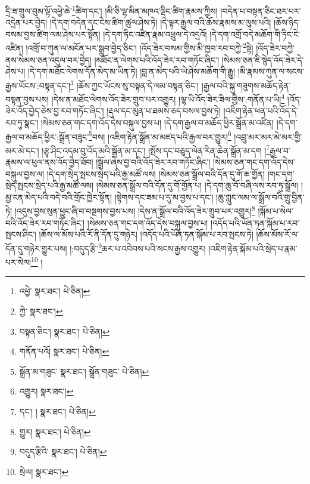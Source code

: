 དྲི་ཟ་གྲུལ་བུམ་ལྟོ་འཕྱེ་ཆེ་\footnote{འཕྱེ་  སྣར་ཐང་།  པེ་ཅིན། }ཚིག་དང་། །མི་ཅི་ལྷ་མིན་མཁའ་ལྡིང་ཚིག་རྣམས་ཀྱིས། །བདེན་པ་བསྟན་ཅིང་ཐར་པར་འདྲེན་པར་བྱེད། །དེ་དག་བདེན་དང་ངེས་ཚིག་ཚུལ་ཤེས་ཏེ། །དེ་ལྟར་རྒྱལ་བའི་ཆོས་རྣམས་མ་ལུས་པའི། །ཆོས་ཉིད་བསམ་བྱས་ཚིག་ལམ་ཤེས་པར་སྟོན། །དེ་དག་ཏིང་འཛིན་རྣམ་འཕྲུལ་དེ་འདྲའོ། །དེ་དག་འགྲོ་བདེ་མཆོག་གི་ཏིང་ངེ་འཛིན། །འགྲོ་བ་ཀུན་ལ་མངོན་པར་སྒྲུབ་བྱེད་ཅིང་། །འོད་ཟེར་བསམ་གྱིས་མི་ཁྱབ་རབ་བཀྱེ་\footnote{ཀྱེ་  སྣར་ཐང་། }སྟེ། །འོད་ཟེར་བཀྱེ་ནས་སེམས་ཅན་འདུལ་བར་བྱེད། །མཐོང་ན་ལེགས་པའི་འོད་ཟེར་རབ་གཏོང་ཞིང་། །སེམས་ཅན་ཇི་སྙེད་འོད་ཟེར་དེ་ཤེས་པ། །དེ་དག་མཐོང་ལེགས་དོན་མེད་མ་ཡིན་ཏེ། །བླ་ན་མེད་པའི་ཡེ་ཤེས་མཆོག་གི་རྒྱུ། །མི་རྣམས་ཀུན་ལ་སངས་རྒྱས་ཡོངས་:བསྟན་དང་།\footnote{བསྟན་ཅིང་།  སྣར་ཐང་།  པེ་ཅིན། } །ཆོས་ཀྱང་ཡོངས་སུ་བསྟན་དེ་ལམ་བསྟན་ཅིང་། །རྒྱལ་བའི་སྐུ་གཟུགས་མཆོད་རྟེན་བསྟན་བྱས་པས། །དེས་ན་མཐོང་ལེགས་འོད་ཟེར་གྲུབ་པར་འགྱུར། །ལྷ་ཡི་འོད་ཟེར་ཟིལ་གྱིས་:གནོན་པ་ཡི།\footnote{གནོན་པའོ།  སྣར་ཐང་།  པེ་ཅིན། } །འོད་ཟེར་འོད་བྱེད་ཅེས་བྱ་རབ་གཏོང་ཞིང་། །རྡུལ་དང་མུན་པ་ཐམས་ཅད་བསལ་བྱས་ཏེ། །འཇིག་རྟེན་ཕན་པའི་འོད་དེ་རབ་ཏུ་སྣང་། །སེམས་ཅན་གང་དག་འོད་དེས་བསྐུལ་བྱས་པ། །དེ་དག་རྒྱལ་བ་མཆོད་ཕྱིར་སྒྲོན་མ་འཛིན། །དེ་དག་རྒྱལ་བ་མཆོད་ཕྱིར་:སྒྲོན་བཟུང་\footnote{སྒྲོན་མ་གཟུང་  སྣར་ཐང་། སྒྲོན་གཟུང་  པེ་ཅིན། }བས། །འཇིག་རྟེན་སྒྲོན་མ་མཛད་པའི་རྒྱལ་བར་གྱུར།\footnote{འགྱུར།  སྣར་ཐང་། } །འབྲུ་མར་མར་མེ་མར་གྱི་མར་མེ་དང་། །རྩྭ་ཤིང་འདམ་བུ་འོད་མའི་སྒྲོན་མ་དང་། །སྤོས་དང་བཅུད་ལེན་རིན་ཆེན་སྒྲོན་མ་དག །\footnote{དང་། །  སྣར་ཐང་།  པེ་ཅིན། }རྒྱལ་བ་རྣམས་ལ་ཕུལ་ནས་འོད་བྱེད་ཐོབ། །སྒྲོལ་ཞེས་བྱ་བའི་འོད་ཟེར་རབ་གཏོང་ཞིང་། །སེམས་ཅན་གང་དག་འོད་དེས་བསྐུལ་བྱས་ལ། །དེ་དག་སྲེད་སྤངས་སྲེད་པའི་རྒྱ་མཚོ་ལས། །སེམས་ཅན་སྒྲོལ་བའི་དོན་དུ་གོ་ཆ་གྱོན། །གང་དག་སྲེད་སྤངས་སྲེད་པའི་རྒྱ་མཚོ་ལས། །སེམས་ཅན་སྒྲོལ་བའི་དོན་དུ་གོ་གྱོན་པ། །དེ་དག་ཆུ་བོ་བཞི་ལས་རབ་ཏུ་སྒྲོལ། །མྱ་ངན་མེད་པའི་བདེ་བའི་གྲོང་ཁྱེར་སྟོན། །སྟེགས་དང་ཟམ་པ་དུ་མ་བྱས་པ་དང་། །ཆུ་ཀླུང་ལམ་ལ་སྒྲོལ་བའི་གྲུ་བྱིན་ཏེ། །འདུས་བྱས་སུན་ཕྱུང་ཞི་བ་བསྔགས་བྱས་པས། །དེས་ན་སྒྲོལ་བའི་འོད་ཟེར་གྲུབ་པར་འགྱུར།\footnote{གྱུར།  སྣར་ཐང་།  པེ་ཅིན། } །སྐོམ་པ་སེལ་བའི་འོད་ཟེར་རབ་གཏོང་ཞིང་། །སེམས་ཅན་གང་དག་འོད་དེས་བསྐུལ་བྱས་པ། །འདོད་པའི་ཡོན་ཏན་སྐོམ་པ་རབ་སྤངས་ཤིང་། །ཆོས་ལ་མོས་པའི་རོ་ནི་དོན་དུ་གཉེར། །འདོད་པའི་ཡོན་ཏན་སྐོམ་པ་རབ་སྤངས་ཏེ། །ཆོས་མོས་རོ་ལ་དོན་དུ་གཉེར་གྱུར་པས། །:བདུད་རྩི་\footnote{བདུད་རྩིའི་  སྣར་ཐང་།  པེ་ཅིན། }ཆར་པ་འབེབས་པའི་སངས་རྒྱས་འགྱུར། །འཇིག་རྟེན་སྐོམ་པའི་སྲེད་པ་རྣམ་པར་སེལ།\footnote{སྲེལ།  སྣར་ཐང་། } །
